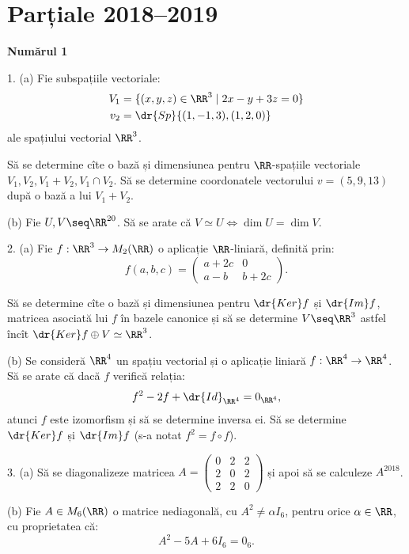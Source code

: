 \chapter{Parțiale 2018--2019}

\textbf{Numărul 1}

1. (a) Fie subspațiile vectoriale:
\begin{align*}
  V_1 &= \{ (x, y, z) \in \RR^3 \mid 2x - y + 3z = 0 \} \\
  v_2 &= \dr{Sp}\{ (1, -1, 3), (1, 2, 0) \}
\end{align*}
ale spațiului vectorial $ \RR^3 $.

Să se determine cîte o bază și dimensiunea pentru $ \RR $-spațiile vectoriale
$ V_1, V_2, V_1 + V_2, V_1 \cap V_2 $. Să se determine coordonatele vectorului
$ v = (5, 9, 13) $ după o bază a lui $ V_1 + V_2 $.

(b) Fie $ U, V \seq \RR^{20} $. Să se arate că $ V \simeq U \Leftrightarrow \dim U = \dim V $.

\vspace{0.5cm}

2. (a) Fie $ f : \RR^3 \to M_2(\RR) $ o aplicație $ \RR $-liniară, definită prin:
\[
  f(a, b, c) = %
  \begin{pmatrix}
    a + 2c & 0 \\
    a - b & b + 2c
  \end{pmatrix}.
\]

Să se determine cîte o bază și dimensiunea pentru $ \dr{Ker} f $ și $ \dr{Im}f $, matricea
asociată lui $ f $ în bazele canonice și să se determine $ V \seq \RR^3 $ astfel
încît $ \dr{Ker}f \oplus V \simeq \RR^3 $.

(b) Se consideră $ \RR^4 $ un spațiu vectorial și o aplicație liniară
$ f : \RR^4 \to \RR^4 $. Să se arate că dacă $ f $ verifică relația:
\[
  f^2 - 2f + \dr{Id}_{\RR^4} = 0_{\RR^4},
\]
atunci $ f $ este izomorfism și să se determine inversa ei. Să se determine
$ \dr{Ker}f $ și $ \dr{Im}f $ (s-a notat $ f^2 = f \circ f $).

\vspace{0.5cm}

3. (a) Să se diagonalizeze matricea
$
A = \begin{pmatrix}
  0 & 2 & 2 \\
  2 & 0 & 2 \\
  2 & 2 & 0
\end{pmatrix}
$
și apoi să se calculeze $ A^{2018} $.

(b) Fie $ A \in M_6(\RR) $ o matrice nediagonală, cu $ A^2 \neq \alpha I_6 $, pentru
orice $ \alpha \in \RR $, cu proprietatea că:
\[
  A^2 - 5 A + 6I_6 = 0_6.
\]

